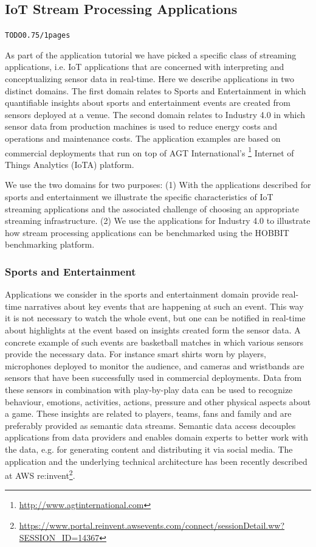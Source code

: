 \subsection{IoT Stream Processing Applications}
\begin{alltt}TODO\scriptsize 0.75/1 pages
\end{alltt}
As part of the application tutorial we have picked a specific class of streaming applications, i.e. IoT applications that are concerned with interpreting and conceptualizing sensor data in real-time. Here we describe applications in two distinct domains. The first domain relates to Sports and Entertainment in which quantifiable insights about sports and entertainment events are created from sensors deployed at a venue. The second domain relates to Industry 4.0 in which sensor data from production machines is used to reduce energy costs and operations and maintenance costs. The application examples are based on commercial deployments that run on top of AGT International's \footnote{\url{http://www.agtinternational.com}} Internet of Things Analytics (IoTA) platform. 

We use the two domains for two purposes: (1) With the applications described for sports and entertainment we illustrate the specific characteristics of IoT streaming applications and the associated challenge of choosing an appropriate streaming infrastructure. (2) We use the applications for Industry 4.0 to illustrate how stream processing applications can be benchmarked using the HOBBIT benchmarking platform.

\subsubsection{Sports and Entertainment}
Applications we consider in the sports and entertainment domain provide real-time narratives about key events that are happening at such an event. This way it is not necessary to watch the whole event, but one can be notified in real-time about highlights at the event based on insights created form the sensor data. A concrete example of such events are basketball matches in which various sensors provide the necessary data. For instance smart shirts worn by players, microphones deployed to monitor the audience, and cameras and wristbands are sensors that have been successfully used in commercial deployments. Data from these sensors in combination with play-by-play data can be used to recognize behaviour, emotions, activities, actions, pressure and other physical aspects about a game. These insights are related to players, teams, fans and family and are preferably provided as semantic data streams. Semantic data access decouples applications from data providers and enables domain experts to better work with the data, e.g. for generating content and distributing it via social media. The application and the underlying technical architecture has been recently described at AWS re:invent\footnote{\url{https://www.portal.reinvent.awsevents.com/connect/sessionDetail.ww?SESSION_ID=14367}}.

